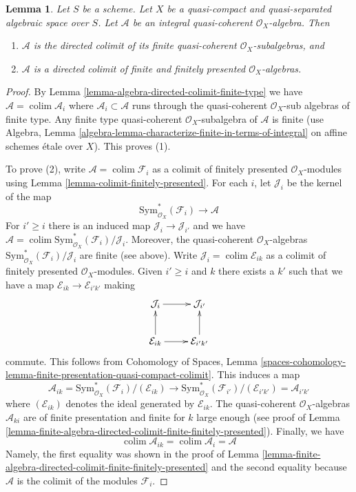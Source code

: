 \documentclass{stacks-project}
\theoremstyle{plain}
\newtheorem{lemma}[subsection]{Lemma}
\theoremstyle{definition}
\theoremstyle{remark}
\numberwithin{equation}{subsection}
\def\colim{\mathop{\mathrm{colim}}\nolimits}
\begin{document}
\begin{lemma}
\label{lemma-integral-algebra-directed-colimit-finite}
Let $S$ be a scheme. Let $X$ be a quasi-compact and quasi-separated
algebraic space over $S$. Let $\mathcal{A}$ be an integral quasi-coherent
$\mathcal{O}_X$-algebra. Then
\begin{enumerate}
\item $\mathcal{A}$ is the directed colimit of its finite
quasi-coherent $\mathcal{O}_X$-subalgebras, and
\item $\mathcal{A}$ is a directed colimit of finite and finitely presented
$\mathcal{O}_X$-algebras.
\end{enumerate}
\end{lemma}

\begin{proof}
By Lemma \ref{lemma-algebra-directed-colimit-finite-type} we have
$\mathcal{A} = \colim \mathcal{A}_i$ where
$\mathcal{A}_i \subset \mathcal{A}$ runs through the
quasi-coherent $\mathcal{O}_X$-sub algebras of finite type.
Any finite type quasi-coherent $\mathcal{O}_X$-subalgebra
of $\mathcal{A}$ is finite (use Algebra, Lemma
\ref{algebra-lemma-characterize-finite-in-terms-of-integral}
on affine schemes \'etale over $X$). This proves (1).

\medskip\noindent
To prove (2), write $\mathcal{A} = \colim \mathcal{F}_i$
as a colimit of finitely presented $\mathcal{O}_X$-modules using
Lemma \ref{lemma-colimit-finitely-presented}.
For each $i$, let $\mathcal{J}_i$ be the kernel of the map
$$
\text{Sym}^*_{\mathcal{O}_X}(\mathcal{F}_i) \longrightarrow \mathcal{A}
$$
For $i' \geq i$ there is an induced map $\mathcal{J}_i \to \mathcal{J}_{i'}$
and we have $\mathcal{A} =
\colim \text{Sym}^*_{\mathcal{O}_X}(\mathcal{F}_i)/\mathcal{J}_i$.
Moreover, the quasi-coherent $\mathcal{O}_X$-algebras
$\text{Sym}^*_{\mathcal{O}_X}(\mathcal{F}_i)/\mathcal{J}_i$
are finite (see above). Write $\mathcal{J}_i = \colim \mathcal{E}_{ik}$
as a colimit of finitely presented $\mathcal{O}_X$-modules.
Given $i' \geq i$ and $k$ there exists a $k'$ such that we
have a map $\mathcal{E}_{ik} \to \mathcal{E}_{i'k'}$
making
$$
\xymatrix{
\mathcal{J}_i \ar[r] & \mathcal{J}_{i'} \\
\mathcal{E}_{ik} \ar[u] \ar[r] & \mathcal{E}_{i'k'} \ar[u]
}
$$
commute. This follows from
Cohomology of Spaces, Lemma
\ref{spaces-cohomology-lemma-finite-presentation-quasi-compact-colimit}.
This induces a map
$$
\mathcal{A}_{ik} =
\text{Sym}^*_{\mathcal{O}_X}(\mathcal{F}_i)/(\mathcal{E}_{ik})
\longrightarrow
\text{Sym}^*_{\mathcal{O}_X}(\mathcal{F}_{i'})/(\mathcal{E}_{i'k'}) =
\mathcal{A}_{i'k'}
$$
where $(\mathcal{E}_{ik})$ denotes the ideal generated by $\mathcal{E}_{ik}$.
The quasi-coherent $\mathcal{O}_X$-algebras $\mathcal{A}_{ki}$
are of finite presentation and finite for $k$ large enough
(see proof of
Lemma \ref{lemma-finite-algebra-directed-colimit-finite-finitely-presented}).
Finally, we have
$$
\colim \mathcal{A}_{ik} = \colim \mathcal{A}_i = \mathcal{A}
$$
Namely, the first equality was shown in the proof of
Lemma \ref{lemma-finite-algebra-directed-colimit-finite-finitely-presented}
and the second equality because $\mathcal{A}$ is the colimit of
the modules $\mathcal{F}_i$.
\end{proof}
\end{document}
